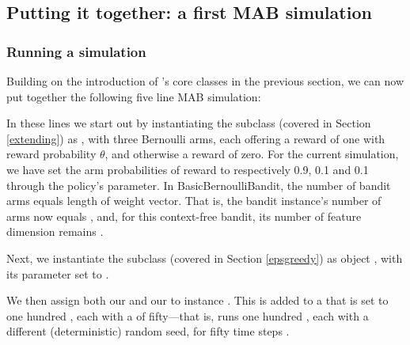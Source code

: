 \documentclass{jss}
\begin{document}
\subsection{Putting it together: a first MAB simulation}

\subsubsection{Running a simulation}

Building on the introduction of 's core classes in the previous section, we can now put together the following five line MAB simulation:

\begin{CodeChunk}
\end{CodeChunk}

In these lines we start out by instantiating the  subclass  (covered in Section \ref{extending}) as , with three Bernoulli arms, each offering a reward of one with reward probability $\theta$, and otherwise a reward of zero. For the current simulation, we have set the  arm probabilities of reward to respectively 0.9, 0.1 and 0.1 through the policy's  parameter. In BasicBernoulliBandit, the number of bandit arms equals length of weight vector. That is, the bandit instance's number of arms  now equals , and, for this context-free bandit, its number of feature dimension  remains .

Next, we instantiate the  subclass  (covered in Section \ref{epsgreedy}) as object , with its  parameter set to .

We then assign both our  and our  to  instance . This  is added to a  that is set to one hundred , each with a  of fifty---that is,  runs one hundred , each with a different (deterministic) random seed, for fifty time steps .
\end{document}

